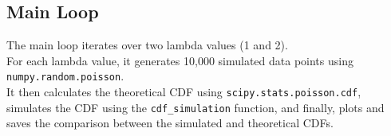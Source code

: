 \documentclass[journal,12pt,twocolumn]{IEEEtran}
\theoremstyle{remark}
\begin{document}
\subsection{Main Loop}
The main loop iterates over two lambda values (1 and 2).\\ 
For each lambda value, it generates 10,000 simulated data points using \texttt{numpy.random.poisson}.\\ 
It then calculates the theoretical CDF using \texttt{scipy.stats.poisson.cdf}, simulates the CDF using the \texttt{cdf\_simulation} function, and finally, plots and saves the comparison between the simulated and theoretical CDFs.
\end{document}
